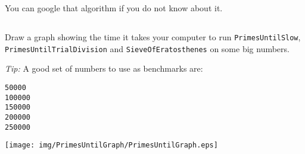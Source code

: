 \documentclass[a4paper, 12pt]{article}
\begin{document}
You can google that algorithm if you do not know about it.


\subsection{}

Draw a graph showing the time it takes your computer to run
\texttt{PrimesUntilSlow}, \\\texttt{PrimesUntilTrialDivision} and
\texttt{SieveOfEratosthenes} on some big numbers.

\textsl{Tip:} A good set of numbers to use as benchmarks are:

\begin{verbatim}
50000
100000
150000
200000
250000
\end{verbatim}

\begin{solution}
  \centering
  \texttt{[image: img/PrimesUntilGraph/PrimesUntilGraph.eps]}
\end{solution}
\end{document}

